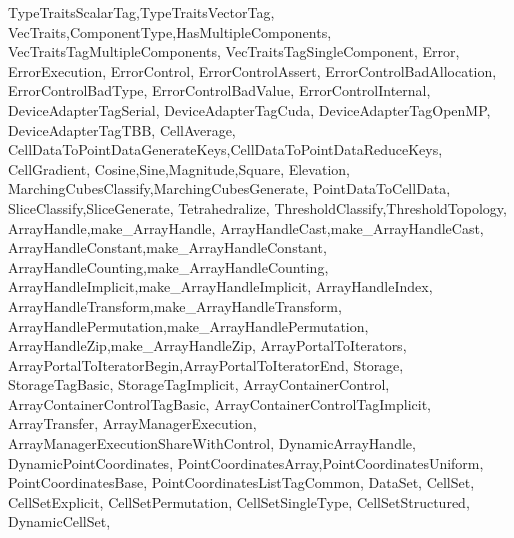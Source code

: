 {{                   TypeTraitsScalarTag,TypeTraitsVectorTag,
                   VecTraits,ComponentType,HasMultipleComponents,
                   VecTraitsTagMultipleComponents,
                   VecTraitsTagSingleComponent,
                   Error, ErrorExecution, ErrorControl,
                   ErrorControlAssert,
                   ErrorControlBadAllocation,
                   ErrorControlBadType,
                   ErrorControlBadValue,
                   ErrorControlInternal,
                   DeviceAdapterTagSerial,
                   DeviceAdapterTagCuda,
                   DeviceAdapterTagOpenMP,
                   DeviceAdapterTagTBB,
                   CellAverage,
                   CellDataToPointDataGenerateKeys,CellDataToPointDataReduceKeys,
                   CellGradient,
                   Cosine,Sine,Magnitude,Square,
                   Elevation,
                   MarchingCubesClassify,MarchingCubesGenerate,
                   PointDataToCellData,
                   SliceClassify,SliceGenerate,
                   Tetrahedralize,
                   ThresholdClassify,ThresholdTopology,
                   ArrayHandle,make_ArrayHandle,
                   ArrayHandleCast,make_ArrayHandleCast,
                   ArrayHandleConstant,make_ArrayHandleConstant,
                   ArrayHandleCounting,make_ArrayHandleCounting,
                   ArrayHandleImplicit,make_ArrayHandleImplicit,
                   ArrayHandleIndex,
                   ArrayHandleTransform,make_ArrayHandleTransform,
                   ArrayHandlePermutation,make_ArrayHandlePermutation,
                   ArrayHandleZip,make_ArrayHandleZip,
                   ArrayPortalToIterators,
                   ArrayPortalToIteratorBegin,ArrayPortalToIteratorEnd,
                   Storage,
                   StorageTagBasic,
                   StorageTagImplicit,
                   ArrayContainerControl,
                   ArrayContainerControlTagBasic,
                   ArrayContainerControlTagImplicit,
                   ArrayTransfer,
                   ArrayManagerExecution,
                   ArrayManagerExecutionShareWithControl,
                   DynamicArrayHandle,
                   DynamicPointCoordinates,
                   PointCoordinatesArray,PointCoordinatesUniform,
                   PointCoordinatesBase,
                   PointCoordinatesListTagCommon,
                   DataSet,
                   CellSet,
                   CellSetExplicit,
                   CellSetPermutation,
                   CellSetSingleType,
                   CellSetStructured,
                   DynamicCellSet,
}}
